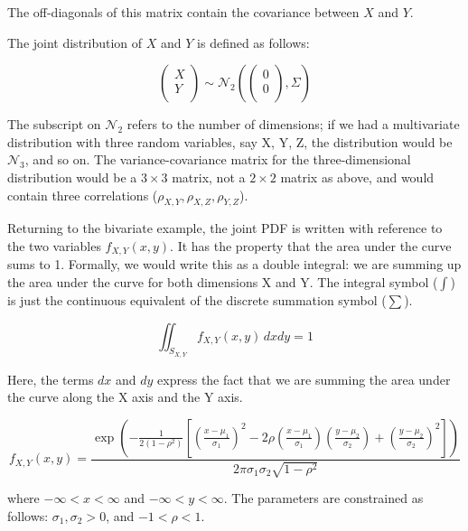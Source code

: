 \documentclass[
  12pt,
]{krantz}
\theoremstyle{definition}
\theoremstyle{definition}
\theoremstyle{definition}
\theoremstyle{definition}
\theoremstyle{remark}
\begin{document}
The off-diagonals of this matrix contain the covariance between \(X\) and \(Y\).

The joint distribution of \(X\) and \(Y\) is defined as follows:

\begin{equation}\label{eq:jointpriordistfoundations}
\begin{pmatrix}
  X \\ 
  Y \\
\end{pmatrix}
\sim 
\mathcal{N}_2 \left(
\begin{pmatrix}
  0 \\
  0 \\
\end{pmatrix},
\Sigma
\right)
\end{equation}

The subscript on \(\mathcal{N}_2\) refers to the number of dimensions; if we had a multivariate distribution with three random variables, say X, Y, Z, the distribution would be \(\mathcal{N}_3\), and so on. The variance-covariance matrix for the three-dimensional distribution would be a \(3\times 3\) matrix, not a \(2\times 2\) matrix as above, and would contain three correlations (\(\rho_{X,Y},\rho_{X,Z},\rho_{Y,Z}\)).

Returning to the bivariate example, the joint PDF is written with reference to the two variables \(f_{X,Y}(x,y)\). It has the property that the area under the curve sums to 1. Formally, we would write this as a double integral: we are summing up the area under the curve for both dimensions X and Y. The integral symbol (\(\int\)) is just the continuous equivalent of the discrete summation symbol (\(\sum\)).

\begin{equation}
\iint_{S_{X,Y}} f_{X,Y}(x,y)\, dx dy = 1
\end{equation}

Here, the terms \(dx\) and \(dy\) express the fact that we are summing the area under the curve along the X axis and the Y axis.

\begin{equation}
f_{X,Y}(x,y) = \frac{\exp(-\frac{1}{2(1-\rho^2)}\left[(\frac{x-\mu_1}{\sigma_1})^2 -2 \rho(\frac{x-\mu_1}{\sigma_1})(\frac{y-\mu_2}{\sigma_2}) + (\frac{y-\mu_2}{\sigma_2})^2  \right])}{2\pi \sigma_1\sigma_2\sqrt{1-\rho^2} }
\end{equation}

where \(-\infty < x < \infty\) and \(-\infty < y < \infty\). The parameters are constrained as follows: \(\sigma_1, \sigma_2 > 0\), and \(-1 < \rho < 1\).
\end{document}
